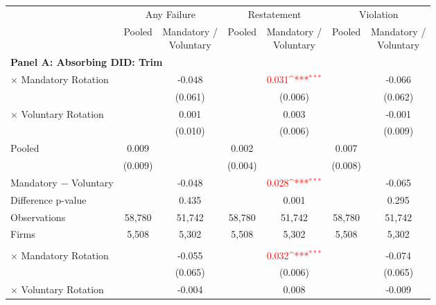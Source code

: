 \documentclass[10pt]{article}
\newcommand{\sym}[1]{\textsuperscript{#1}}
\begin{document}
\begin{minipage}{19cm}\fontsize{10}{12}\selectfont\setlength{\tabcolsep}{4pt}\renewcommand{\arraystretch}{1.12}


\def\sym#1{\ifmmode^{#1}\else\(^{#1}\)\fi}
\centering
{}
\label{tab:absorbing-transition-big4-background-downgrade-no-auditfirm-fe}
\begin{threeparttable}

\begin{tabular}{l cc cc cc}
\toprule
 & \multicolumn{2}{c}{Any Failure} & \multicolumn{2}{c}{Restatement} & \multicolumn{2}{c}{Violation} \\
\cmidrule(lr){2-3}\cmidrule(lr){4-5}\cmidrule(lr){6-7}
 & Pooled & \shortstack{Mandatory /\\Voluntary} & Pooled & \shortstack{Mandatory /\\Voluntary} & Pooled & \shortstack{Mandatory /\\Voluntary} \\
\midrule
\multicolumn{7}{l}{\textbf{Panel A: Absorbing DID: Trim}} \\
$\times$ Mandatory Rotation &  & -0.048 &  & \textcolor{red}{0.031\sym{***}} &  & -0.066 \\
 &  & (0.061) &  & (0.006) &  & (0.062) \\
$\times$ Voluntary Rotation &  & 0.001 &  & 0.003 &  & -0.001 \\
 &  & (0.010) &  & (0.006) &  & (0.009) \\
Pooled & 0.009 &  & 0.002 &  & 0.007 &  \\
 & (0.009) &  & (0.004) &  & (0.008) &  \\
Mandatory $-$ Voluntary &  & -0.048 &  & \textcolor{red}{0.028\sym{***}} &  & -0.065 \\
Difference p-value &  & 0.435 &  & 0.001 &  & 0.295 \\
Observations & 58,780 & 51,742 & 58,780 & 51,742 & 58,780 & 51,742 \\
Firms & 5,508 & 5,302 & 5,508 & 5,302 & 5,508 & 5,302 \\
\addlinespace
\multicolumn{7}{l}{\textbf{Panel B: Absorbing DID: Strict}} \\
$\times$ Mandatory Rotation &  & -0.055 &  & \textcolor{red}{0.032\sym{***}} &  & -0.074 \\
 &  & (0.065) &  & (0.006) &  & (0.065) \\
$\times$ Voluntary Rotation &  & -0.004 &  & 0.008 &  & -0.009 \\

\end{tabular}
\end{threeparttable}
\end{minipage}
\end{document}
